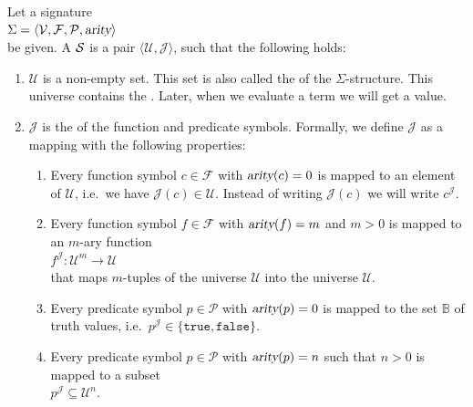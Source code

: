 \begin{Definition}[Structure]
    Let a signature \\[0.2cm]
    \hspace*{1.3cm} $\Sigma = \langle \mathcal{V}, \mathcal{F}, \mathcal{P}, \textsl{arity} \rangle$ \\[0.2cm]
    be given. A  $\mathcal{S}$ is a
    pair $\langle \mathcal{U}, \mathcal{J} \rangle$, such that the following holds:
    \begin{enumerate}
        \item $\mathcal{U}$ is a non-empty set. This set is also called the
                of the $\Sigma$-structure. This universe contains the .
              Later, when we evaluate a term we will get a value.
        \item $\mathcal{J}$ is the   of the function and predicate symbols.
              Formally, we define $\mathcal{J}$ as a mapping with the following properties:
        \begin{enumerate}
        \item Every function symbol $c \in \mathcal{F}$ with $\textsl{arity}(c) = 0$ is mapped to an element
              of $\mathcal{U}$, i.e.~we have $\mathcal{J}(c) \in \mathcal{U}$.  Instead of writing
              $\mathcal{J}(c)$ we will write $c^{\mathcal{J}}$.
        \item Every function symbol $f \in \mathcal{F}$ with $\textsl{arity}(f) = m$ and $m > 0$ is mapped to
              an $m$-ary function \\[0.2cm]
              \hspace*{1.3cm}
              $f^\mathcal{J}\colon \mathcal{U}^m \rightarrow \mathcal{U}$ \\[0.2cm]
              that maps $m$-tuples of the universe $\mathcal{U}$ into the universe $\mathcal{U}$.
        \item Every predicate symbol $p \in \mathcal{P}$ with $\textsl{arity}(p) = 0$ is mapped to
              the set $\mathbb{B}$ of truth values, i.e.~$p^{\mathcal{J}} \in \{ \mathtt{true}, \mathtt{false}\}$.
        \item Every predicate symbol $p \in \mathcal{P}$ with $\textsl{arity}(p) = n$ such that $n > 0$ is mapped to
              a subset \\[0.2cm]
              \hspace*{1.3cm} 
              $p^\mathcal{J} \subseteq \mathcal{U}^n$. \\[0.2cm]

\end{enumerate}
\end{enumerate}
\end{Definition}
